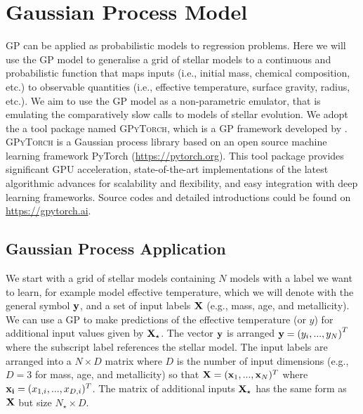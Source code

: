 \section{Gaussian Process Model}\label{sec:gpmodel}

GP can be applied as probabilistic models to regression problems. Here we will use the GP model to generalise a grid of stellar models to a continuous and probabilistic function that maps inputs (i.e., initial mass, chemical composition, etc.) to observable quantities (i.e., effective temperature, surface gravity, radius, etc.).  We aim to use the GP model as a non-parametric emulator, that is emulating the comparatively slow calls to models of stellar evolution. 
%
We adopt the a tool package named \textsc{GPyTorch}, which is a GP framework developed by \citet{gardner2018gpytorch}. \textsc{GPyTorch} is a Gaussian process library based on an open source machine learning framework PyTorch (\url{https://pytorch.org}). This tool package provides significant GPU acceleration, state-of-the-art implementations of the latest algorithmic advances for scalability and flexibility, and easy integration with deep learning frameworks. Source codes and detailed introductions could be found on \url{https://gpytorch.ai}.

\subsection{Gaussian Process Application}

We start with a grid of stellar models containing $N$ models with a label we want to learn, for example model effective temperature, which we will denote with the general symbol $\bf y$, and a set of input labels $\bf X$ (e.g., mass, age, and metallicity).  We can use a GP to make predictions of the effective temperature (or $y$) for additional input values given by $\bf X_{\star}$.  The vector $\bf y$ is arranged ${\bf y} = \left(y_{i}, ... ,y_{N} \right)^{T}$ where the subscript label references the stellar model.  The input labels are arranged into a $N \times D$ matrix where $D$ is the number of input dimensions (e.g., $D=3$ for mass, age, and metallicity) so that ${\bf X} = ({\bf x}_{1}, ..., {\bf x}_{N})^{T}$ where ${\bf x_{i}} = (x_{1, i}, ..., x_{D, i})^{T}$.  The matrix of additional inputs $\bf X_{\star}$ has the same form as $\bf X$ but size $N_{\star} \times D$.

